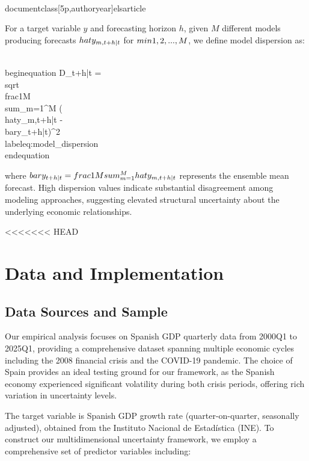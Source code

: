 \\documentclass[5p,authoryear]{elsarticle}
\begin{document}
{For a target variable $y$ and forecasting horizon $h$, given $M$ different models producing forecasts $\\hat{y}_{m,t+h|t}$ for $m \\in \\{1,2,...,M\\}$, we define model dispersion as:

\\begin{equation}
D_{t+h|t} = \\sqrt{\\frac{1}{M} \\sum_{m=1}^{M} (\\hat{y}_{m,t+h|t} - \\bar{y}_{t+h|t})^2}
\\label{eq:model_dispersion}
\\end{equation}

where $\\bar{y}_{t+h|t} = \\frac{1}{M} \\sum_{m=1}^{M} \\hat{y}_{m,t+h|t}$ represents the ensemble mean forecast. High dispersion values indicate substantial disagreement among modeling approaches, suggesting elevated structural uncertainty about the underlying economic relationships.

<<<<<<< HEAD
\section{Data and Implementation}

\subsection{Data Sources and Sample}

Our empirical analysis focuses on Spanish GDP quarterly data from 2000Q1 to 2025Q1, providing a comprehensive dataset spanning multiple economic cycles including the 2008 financial crisis and the COVID-19 pandemic. The choice of Spain provides an ideal testing ground for our framework, as the Spanish economy experienced significant volatility during both crisis periods, offering rich variation in uncertainty levels.

The target variable is Spanish GDP growth rate (quarter-on-quarter, seasonally adjusted), obtained from the Instituto Nacional de Estadística (INE). To construct our multidimensional uncertainty framework, we employ a comprehensive set of predictor variables including:

}
\end{document}
